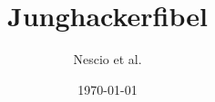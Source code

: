 \documentclass[a4paper,11pt]{scrbook}
\makeatletter
\DeclareRobustCommand{\,}{%
  \relax\ifmmode\mskip\thinmuskip\else\thinspace\fi
  \@ifstar{\hskip\z@skip}{}%
}
\makeatother
\begin{document}
\frontmatter

\title{Junghackerfibel}
\author{Nescio et al.}
\date{\today}
\maketitle




\tableofcontents %

\mainmatter


\backmatter

\listoffigures

\listoftables 
\end{document}
